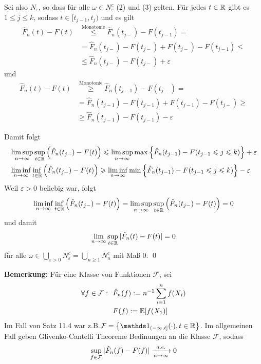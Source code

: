 Sei also $N_\varepsilon$, so dass f\"ur alle $\omega\in N_\varepsilon^c$ (2) und (3) gelten. F\"ur jedes $t\in\mathbb{R}$ gibt es $1\leq j\leq k $, sodass $t\in[t_{j-1},t_j)$ und es gilt		
\begin{align*}
    \hat{F}_n(t)-F(t)&\stackrel{\text{Monotonie}}{\leq}\hat{F}_n(t_{j-})-F(t_{j-1}) =\\ 
    &=\hat{F}_n(t_{j-})-F(t_{j-})+F(t_{j-})-F(t_{j-1})\leq \\
    &\leq \hat{F}_n(t_{j-})-F(t_{j-})+\varepsilon
\end{align*}
und
\begin{align*}
    \hat{F}_n(t)-F(t)&\stackrel{\text{Monotonie}}{\geq}\hat{F}_n(t_{j-1})-F(t_{j-})= \\
    &=\hat{F}_n(t_{j-1})-F(t_{j-1})+F(t_{j-1})-F(t_{j-})\geq \\
    &\geq \hat{F}_n(t_{j-1})-F(t_{j-1})-\varepsilon
\end{align*}

Damit folgt
\begin{align*}
    &\limsup_{n\to\infty}\sup_{t\in\mathbb{R}}\left(
    \hat{F}_n(t_{j-})-F(t)\right)\leqslant\limsup_{n\to\infty}\max\left\{\hat{F}_n(t_{j-1})-F(t_{j-1}\leqslant j\leqslant k)\right\}+\varepsilon \\
    &\liminf_{n\to\infty}\inf_{t\in\mathbb{R}}\left(\hat{F}_n(t_{j-})-F(t)\right)\geqslant\liminf_{n\to\infty}\min\left\{\hat{F}_n(t_{j-1})-F(t_{j-1}\leqslant j\leqslant k)\right\}-\varepsilon
\end{align*}
Weil $\varepsilon>0$ beliebig war, folgt
	$$\liminf_{n\to\infty}\inf_{t\in\mathbb{R}}\left(\hat{F}_n(t_{j-})-F(t)\right)=\limsup_{n\to\infty}\sup_{t\in\mathbb{R}}\left(\hat{F}_n(t_{j-})-F(t)\right)=0$$
und damit
	$$\lim_{n\to\infty}\sup_{t\in\mathbb{R}}|\hat{F}_n(t)-F(t)|=0$$
f\"ur alle $\omega\in\displaystyle\bigcup_{\varepsilon>0}N_\varepsilon^c=\bigcup_{n\geq1}N_n^c$ mit
Ma\ss{} 0. \qed
\newline\newline

\textbf{Bemerkung:} F\"ur eine Klasse von Funktionen $\mathcal{F}$, sei 
\begin{align*}
    \forall f\in\mathcal{F}:  \ \ &\hat{F}_n(f):=n^{-1}\sum_{i=1}^nf(X_i)\\
    &F(f):=\E[f(X_1)]
\end{align*}
Im Fall von Satz 11.4 war z.B.$\mathcal{F}=\left\{\ind{(-\infty,t]}(\cdot),t\in\R\right\}$. Im allgemeinen Fall geben Glivenko-Cantelli Theoreme Bedinungen an die Klasse $\mathcal{F}$, sodass 
    $$\sup_{f\in\mathcal{F}}|\hat{F}_n(f)-F(f)|\nto{a.e.}{n\to\infty}0$$


